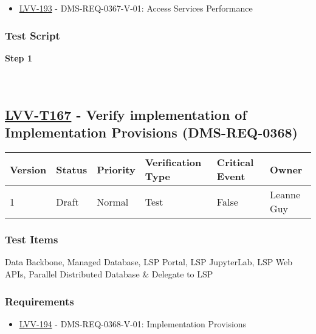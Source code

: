 \begin{itemize}
\tightlist
\item
  \href{https://jira.lsstcorp.org/browse/LVV-193}{LVV-193} -
  DMS-REQ-0367-V-01: Access Services Performance
\end{itemize}

\hypertarget{test-script-143}{%
\subsubsection{Test Script}\label{test-script-143}}

\textbf{Step 1}\\
~\\
~\\

\hypertarget{lvv-t167---verify-implementation-of-implementation-provisions-dms-req-0368}{%
\subsection{\texorpdfstring{\href{https://jira.lsstcorp.org/secure/Tests.jspa\#/testCase/LVV-T167}{LVV-T167}
- Verify implementation of Implementation Provisions
(DMS-REQ-0368)}{LVV-T167 - Verify implementation of Implementation Provisions (DMS-REQ-0368)}}\label{lvv-t167---verify-implementation-of-implementation-provisions-dms-req-0368}}

\begin{longtable}[]{@{}llllll@{}}
\toprule
Version & Status & Priority & Verification Type & Critical Event &
Owner\tabularnewline
\midrule
\endhead
1 & Draft & Normal & Test & False & Leanne Guy\tabularnewline
\bottomrule
\end{longtable}

\hypertarget{test-items-143}{%
\subsubsection{Test Items}\label{test-items-143}}

Data Backbone, Managed Database, LSP Portal, LSP JupyterLab, LSP Web
APIs, Parallel Distributed Database \& Delegate to LSP

\hypertarget{requirements-144}{%
\subsubsection{Requirements}\label{requirements-144}}

\begin{itemize}
\tightlist
\item
  \href{https://jira.lsstcorp.org/browse/LVV-194}{LVV-194} -
  DMS-REQ-0368-V-01: Implementation Provisions
\end{itemize}


